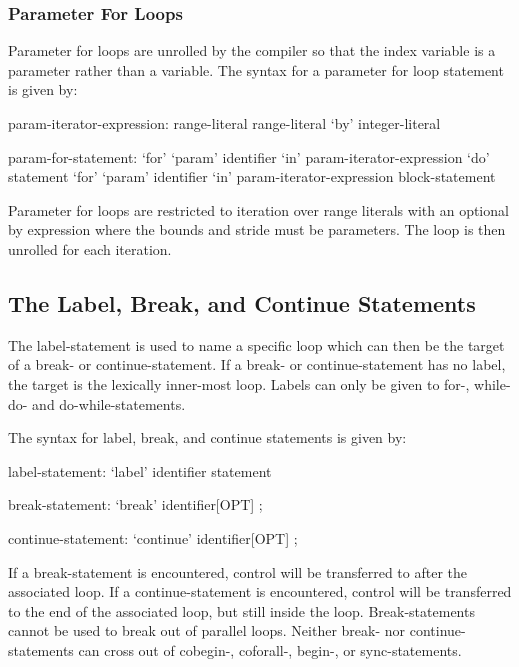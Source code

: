 \subsubsection{Parameter For Loops}
\label{Parameter_For_Loops}


Parameter for loops are unrolled by the compiler so that the index
variable is a parameter rather than a variable.  The syntax for a
parameter for loop statement is given by:
\begin{syntax}
param-iterator-expression:
  range-literal
  range-literal `by' integer-literal

param-for-statement:
  `for' `param' identifier `in' param-iterator-expression `do' statement
  `for' `param' identifier `in' param-iterator-expression block-statement
\end{syntax}
Parameter for loops are restricted to iteration over range literals
with an optional by expression where the bounds and stride must be
parameters.  The loop is then unrolled for each iteration.

\subsection{The Label, Break, and Continue Statements}
\label{Label_Break_Continue}

The label-statement is used to name a specific loop which can then
be the target of a break- or continue-statement.  If a break-
or continue-statement has no label, the target is the lexically
inner-most loop. Labels can only be given to for-, while-do- and
do-while-statements.

The syntax for label, break, and continue statements is given by:
\begin{syntax}
label-statement:
  `label' identifier statement

break-statement:
  `break' identifier[OPT] ;

continue-statement:
  `continue' identifier[OPT] ;
\end{syntax}

If a break-statement is encountered, control will be transferred to
after the associated loop.  If a continue-statement is encountered,
control will be transferred to the end of the associated loop, but
still inside the loop.  Break-statements cannot be used to break out of
parallel loops.  Neither break- nor continue-statements can
cross out of cobegin-, coforall-, begin-, or sync-statements.

